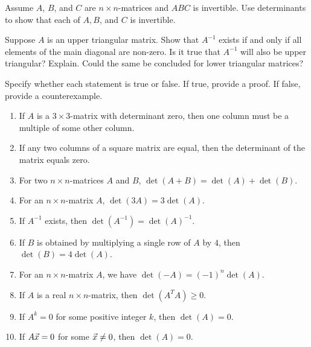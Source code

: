 \documentclass{ximera}
\begin{document}
\begin{example}
  Assume $A$, $B$, and $C$ are $n\times n$-matrices and $ABC$ is
  invertible. Use determinants to show that each of $A,B$, and $C$ is
  invertible.
\end{example}

\begin{example}
  Suppose $A$ is an upper triangular matrix. Show that $A^{-1}$ exists
  if and only if all elements of the main diagonal are non-zero. Is it
  true that $A^{-1}$ will also be upper triangular? Explain. Could the
  same be concluded for lower triangular matrices?
\end{example}

\begin{example}
  Specify whether each statement is true or false. If true, provide a
  proof. If false, provide a counterexample.
  \begin{enumerate}
  \item If $A$ is a $3\times 3$-matrix with determinant zero, then one
    column must be a multiple of some other column.

  \item If any two columns of a square matrix are equal, then the
    determinant of the matrix equals zero.

  \item For two $n\times n$-matrices $A$ and $B$,
    $\det(A+B) = \det(A) + \det(B)$.

  \item For an $n\times n$-matrix $A$, $\det(3A) = 3\det(A)$.

  \item If $A^{-1}$ exists, then $\det(A^{-1}) = \det(A)^{-1}$.

  \item If $B$ is obtained by multiplying a single row of $A$ by $4$,
    then $\det(B) = 4\det(A)$.

  \item For an $n\times n$-matrix $A$, we have
    $\det(-A) = (-1)^n\det(A)$.

  \item If $A$ is a real $n\times n$-matrix, then
    $\det(A^TA) \geq 0$.

  \item If $A^k = 0$ for some positive integer $k$, then
    $\det(A) = 0$.

  \item If $A\vec{x} = 0$ for some $\vec{x} \neq 0$, then
    $\det(A) = 0$.
  \end{enumerate}
\end{example}
\end{document}
